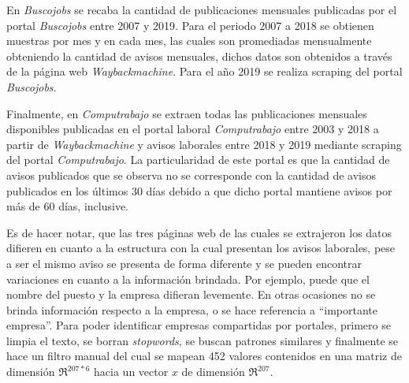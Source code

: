 \documentclass[12pt,oneside]{reedthesis}
\begin{document}
En \emph{Buscojobs} se recaba la cantidad de publicaciones mensuales publicadas por el portal \emph{Buscojobs} entre 2007 y 2019. Para el periodo 2007 a 2018 se obtienen muestras por mes y en cada mes, las cuales son promediadas mensualmente obteniendo la cantidad de avisos mensuales, dichos datos son obtenidos a través de la página web \emph{Waybackmachine}. Para el año 2019 se realiza scraping del portal \emph{Buscojobs}.

Finalmente, en \emph{Computrabajo} se extraen todas las publicaciones mensuales disponibles publicadas en el portal laboral \emph{Computrabajo} entre 2003 y 2018 a partir de \emph{Waybackmachine} y avisos laborales entre 2018 y 2019 mediante scraping del portal \emph{Computrabajo}. La particularidad de este portal es que la cantidad de avisos publicados que se observa no se corresponde con la cantidad de avisos publicados en los últimos 30 días debido a que dicho portal mantiene avisos por más de 60 días, inclusive.

Es de hacer notar, que las tres páginas web de las cuales se extrajeron los datos difieren en cuanto a la estructura con la cual presentan los avisos laborales, pese a ser el mismo aviso se presenta de forma diferente y se pueden encontrar variaciones en cuanto a la información brindada. Por ejemplo, puede que el nombre del puesto y la empresa difieran levemente. En otras ocasiones no se brinda información respecto a la empresa, o se hace referencia a ``importante empresa''. Para poder identificar empresas compartidas por portales, primero se limpia el texto, se borran \emph{stopwords}, se buscan patrones similares y finalmente se hace un filtro manual del cual se mapean 452 valores contenidos en una matriz de dimensión \(\Re^{207*6}\) hacia un vector \(x\) de dimensión \(\Re^{207}\).
\end{document}
